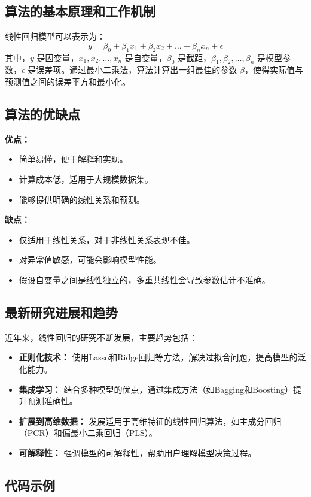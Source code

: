 \subsection*{算法的基本原理和工作机制}
线性回归模型可以表示为：
\[
    y = \beta_0 + \beta_1 x_1 + \beta_2 x_2 + \ldots + \beta_n x_n + \epsilon
\]
其中，\(y\) 是因变量，\(x_1, x_2, \ldots, x_n\) 是自变量，\(\beta_0\) 是截距，\(\beta_1, \beta_2, \ldots, \beta_n\) 是模型参数，\(\epsilon\) 是误差项。通过最小二乘法，算法计算出一组最佳的参数 \(\beta\)，使得实际值与预测值之间的误差平方和最小化。

\subsection*{算法的优缺点}
\textbf{优点：}
\begin{itemize}
    \item 简单易懂，便于解释和实现。
    \item 计算成本低，适用于大规模数据集。
    \item 能够提供明确的线性关系和预测。
\end{itemize}

\textbf{缺点：}
\begin{itemize}
    \item 仅适用于线性关系，对于非线性关系表现不佳。
    \item 对异常值敏感，可能会影响模型性能。
    \item 假设自变量之间是线性独立的，多重共线性会导致参数估计不准确。
\end{itemize}

\subsection*{最新研究进展和趋势}
近年来，线性回归的研究不断发展，主要趋势包括：
\begin{itemize}
    \item \textbf{正则化技术：} 使用Lasso和Ridge回归等方法，解决过拟合问题，提高模型的泛化能力。
    \item \textbf{集成学习：} 结合多种模型的优点，通过集成方法（如Bagging和Boosting）提升预测准确性。
    \item \textbf{扩展到高维数据：} 发展适用于高维特征的线性回归算法，如主成分回归（PCR）和偏最小二乘回归（PLS）。
    \item \textbf{可解释性：} 强调模型的可解释性，帮助用户理解模型决策过程。
\end{itemize}

\subsection*{代码示例}

